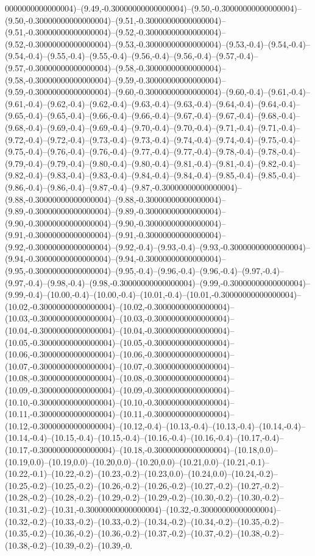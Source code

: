 0000000000000004)--(9.49,-0.30000000000000004)--(9.50,-0.30000000000000004)--(9.50,-0.30000000000000004)--(9.51,-0.30000000000000004)--(9.51,-0.30000000000000004)--(9.52,-0.30000000000000004)--(9.52,-0.30000000000000004)--(9.53,-0.30000000000000004)--(9.53,-0.4)--(9.54,-0.4)--(9.54,-0.4)--(9.55,-0.4)--(9.55,-0.4)--(9.56,-0.4)--(9.56,-0.4)--(9.57,-0.4)--(9.57,-0.30000000000000004)--(9.58,-0.30000000000000004)--(9.58,-0.30000000000000004)--(9.59,-0.30000000000000004)--(9.59,-0.30000000000000004)--(9.60,-0.30000000000000004)--(9.60,-0.4)--(9.61,-0.4)--(9.61,-0.4)--(9.62,-0.4)--(9.62,-0.4)--(9.63,-0.4)--(9.63,-0.4)--(9.64,-0.4)--(9.64,-0.4)--(9.65,-0.4)--(9.65,-0.4)--(9.66,-0.4)--(9.66,-0.4)--(9.67,-0.4)--(9.67,-0.4)--(9.68,-0.4)--(9.68,-0.4)--(9.69,-0.4)--(9.69,-0.4)--(9.70,-0.4)--(9.70,-0.4)--(9.71,-0.4)--(9.71,-0.4)--(9.72,-0.4)--(9.72,-0.4)--(9.73,-0.4)--(9.73,-0.4)--(9.74,-0.4)--(9.74,-0.4)--(9.75,-0.4)--(9.75,-0.4)--(9.76,-0.4)--(9.76,-0.4)--(9.77,-0.4)--(9.77,-0.4)--(9.78,-0.4)--(9.78,-0.4)--(9.79,-0.4)--(9.79,-0.4)--(9.80,-0.4)--(9.80,-0.4)--(9.81,-0.4)--(9.81,-0.4)--(9.82,-0.4)--(9.82,-0.4)--(9.83,-0.4)--(9.83,-0.4)--(9.84,-0.4)--(9.84,-0.4)--(9.85,-0.4)--(9.85,-0.4)--(9.86,-0.4)--(9.86,-0.4)--(9.87,-0.4)--(9.87,-0.30000000000000004)--(9.88,-0.30000000000000004)--(9.88,-0.30000000000000004)--(9.89,-0.30000000000000004)--(9.89,-0.30000000000000004)--(9.90,-0.30000000000000004)--(9.90,-0.30000000000000004)--(9.91,-0.30000000000000004)--(9.91,-0.30000000000000004)--(9.92,-0.30000000000000004)--(9.92,-0.4)--(9.93,-0.4)--(9.93,-0.30000000000000004)--(9.94,-0.30000000000000004)--(9.94,-0.30000000000000004)--(9.95,-0.30000000000000004)--(9.95,-0.4)--(9.96,-0.4)--(9.96,-0.4)--(9.97,-0.4)--(9.97,-0.4)--(9.98,-0.4)--(9.98,-0.30000000000000004)--(9.99,-0.30000000000000004)--(9.99,-0.4)--(10.00,-0.4)--(10.00,-0.4)--(10.01,-0.4)--(10.01,-0.30000000000000004)--(10.02,-0.30000000000000004)--(10.02,-0.30000000000000004)--(10.03,-0.30000000000000004)--(10.03,-0.30000000000000004)--(10.04,-0.30000000000000004)--(10.04,-0.30000000000000004)--(10.05,-0.30000000000000004)--(10.05,-0.30000000000000004)--(10.06,-0.30000000000000004)--(10.06,-0.30000000000000004)--(10.07,-0.30000000000000004)--(10.07,-0.30000000000000004)--(10.08,-0.30000000000000004)--(10.08,-0.30000000000000004)--(10.09,-0.30000000000000004)--(10.09,-0.30000000000000004)--(10.10,-0.30000000000000004)--(10.10,-0.30000000000000004)--(10.11,-0.30000000000000004)--(10.11,-0.30000000000000004)--(10.12,-0.30000000000000004)--(10.12,-0.4)--(10.13,-0.4)--(10.13,-0.4)--(10.14,-0.4)--(10.14,-0.4)--(10.15,-0.4)--(10.15,-0.4)--(10.16,-0.4)--(10.16,-0.4)--(10.17,-0.4)--(10.17,-0.30000000000000004)--(10.18,-0.30000000000000004)--(10.18,0.0)--(10.19,0.0)--(10.19,0.0)--(10.20,0.0)--(10.20,0.0)--(10.21,0.0)--(10.21,-0.1)--(10.22,-0.1)--(10.22,-0.2)--(10.23,-0.2)--(10.23,0.0)--(10.24,0.0)--(10.24,-0.2)--(10.25,-0.2)--(10.25,-0.2)--(10.26,-0.2)--(10.26,-0.2)--(10.27,-0.2)--(10.27,-0.2)--(10.28,-0.2)--(10.28,-0.2)--(10.29,-0.2)--(10.29,-0.2)--(10.30,-0.2)--(10.30,-0.2)--(10.31,-0.2)--(10.31,-0.30000000000000004)--(10.32,-0.30000000000000004)--(10.32,-0.2)--(10.33,-0.2)--(10.33,-0.2)--(10.34,-0.2)--(10.34,-0.2)--(10.35,-0.2)--(10.35,-0.2)--(10.36,-0.2)--(10.36,-0.2)--(10.37,-0.2)--(10.37,-0.2)--(10.38,-0.2)--(10.38,-0.2)--(10.39,-0.2)--(10.39,-0.